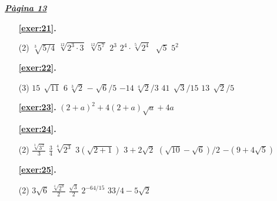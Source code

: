 \hyperlink{page.13}{\textbf{\em Pàgina 13}}
\begin{enumerate}



 \item[\fontfamily{phv}\selectfont\color{blue}\textbf{\ref{exer:21}. }] \label{ans:21}
 \begin{tasks}[column-sep=1em, item-indent=1.3333em](2)
	 \task $\sqrt [{3}]{5/4} $
	 \task $\sqrt [{12}]{2^{3} \cdot 3} $
	 \task $\sqrt [{12}]{5^{7} } $
	 \task $2^{3} $
	 \task $2^{4} \cdot \sqrt [{5}]{2^{4} } $
	 \task $\sqrt [{}]{5} $
	 \task $5^{2} $
\end{tasks}
 \end{enumerate}
\begin{enumerate}



 \item[\fontfamily{phv}\selectfont\color{blue}\textbf{\ref{exer:22}. }] \label{ans:22}
 \begin{tasks}[column-sep=1em, item-indent=1.3333em](3)
	 \task  $15\,\sqrt [{}]{11} $
	 \task $6\,\sqrt [{3}]{2} $
	 \task $-\sqrt [{}]{6} /5$
	 \task $-14\,\sqrt [{4}]{2} /3$
	 \task $41\,\sqrt [{}]{3} /15$
	 \task $13\,\sqrt [{}]{2} /5$
\end{tasks}
\item[\fontfamily{phv}\selectfont\color{blue}\textbf{\ref{exer:23}. }] \label{ans:23} 
$(2+a)^{2} +4(2+a)\sqrt {a} +4a$



 \item[\fontfamily{phv}\selectfont\color{blue}\textbf{\ref{exer:24}. }] \label{ans:24}
 \begin{tasks}[column-sep=1em, item-indent=1.3333em](2)
	 \task $\frac {\sqrt [{3}]{3^{2} } }{3} $
	 \task $\frac {3}{4} \,\sqrt [{4}]{2^{3} }$
	 \task $3(\sqrt {2+1} )$
	 \task $3+2\sqrt {2} $
	 \task $(\sqrt {10} -\sqrt {6} )/2$
	 \task $-(9+4\sqrt {5} )$
\end{tasks}



 \item[\fontfamily{phv}\selectfont\color{blue}\textbf{\ref{exer:25}. }] \label{ans:25}
 \begin{tasks}[column-sep=1em, item-indent=1.3333em](2)
	 \task $3\sqrt {6}$
	 \task* $\frac {\sqrt [{4}]{2^{3} } }{2} $
	 \task $\frac {\sqrt {3} }{2} $
	 \task $2^{-64/15} $
	 \task $33/4-5\sqrt {2} $
\end{tasks}
 \end{enumerate}
\vspace{0.3cm}


